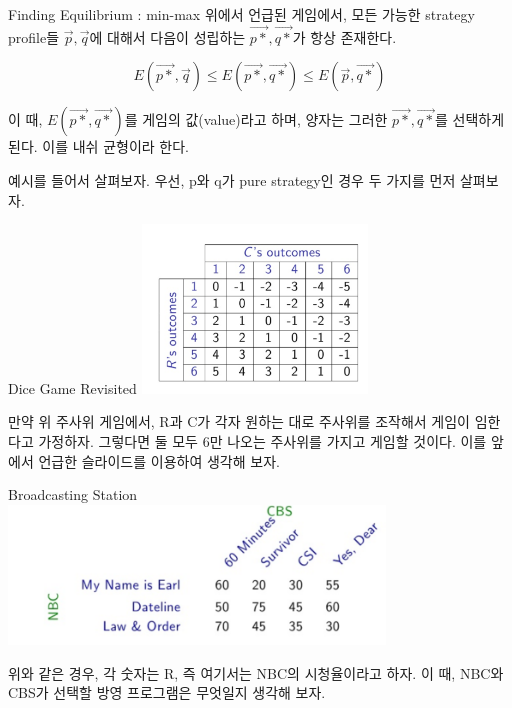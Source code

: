 \documentclass{beamer}
\begin{document}
\begin{frame}{Finding Equilibrium : min-max}
위에서 언급된 게임에서, 모든 가능한 strategy profile들 $\vec{p}, \vec{q}$에 대해서 다음이 성립하는 $\vec{p*}, \vec{q*}$가 항상 존재한다. 

\begin{equation} 
E(\vec{p*}, \vec{q}) \leq E(\vec{p*}, \vec{q*}) \leq E(\vec{p}, \vec{q*}) 
\end{equation}

이 때, $E(\vec{p*}, \vec{q*})$를 게임의 값(value)라고 하며, 양자는 그러한 $\vec{p*}, \vec{q*}$를 선택하게 된다. 이를 내쉬 균형이라 한다. 

예시를 들어서 살펴보자. 우선, p와 q가 pure strategy인 경우 두 가지를 먼저 살펴보자. 
\end{frame} 

\begin{frame}{Dice Game Revisited}
\includegraphics[width=6cm,keepaspectratio]{dice}

만약 위 주사위 게임에서, R과 C가 각자 원하는 대로 주사위를 조작해서 게임이 임한다고 가정하자. 그렇다면 둘 모두 6만 나오는 주사위를 가지고 게임할 것이다. 이를 앞에서 언급한 슬라이드를 이용하여 생각해 보자. 

\end{frame}

\begin{frame}{Broadcasting Station }
\includegraphics[width=10cm,keepaspectratio]{broad}

위와 같은 경우, 각 숫자는 R, 즉 여기서는 NBC의 시청율이라고 하자. 이 때, NBC와 CBS가 선택할 방영 프로그램은 무엇일지 생각해 보자. 

\end{frame}
\end{document}
